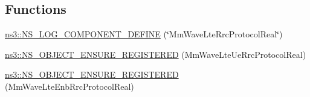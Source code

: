 \subsection*{Functions}
\begin{DoxyCompactItemize}
\item 
\hyperlink{namespacens3_abfce059cb3db299a2934a21e26139ab5}{ns3\+::\+N\+S\+\_\+\+L\+O\+G\+\_\+\+C\+O\+M\+P\+O\+N\+E\+N\+T\+\_\+\+D\+E\+F\+I\+NE} (\char`\"{}Mm\+Wave\+Lte\+Rrc\+Protocol\+Real\char`\"{})
\item 
\hyperlink{namespacens3_ac20e2ee5ce643def8174312956e2715c}{ns3\+::\+N\+S\+\_\+\+O\+B\+J\+E\+C\+T\+\_\+\+E\+N\+S\+U\+R\+E\+\_\+\+R\+E\+G\+I\+S\+T\+E\+R\+ED} (Mm\+Wave\+Lte\+Ue\+Rrc\+Protocol\+Real)
\item 
\hyperlink{namespacens3_a8d06b46fed33a8ff4350e7eb6288734c}{ns3\+::\+N\+S\+\_\+\+O\+B\+J\+E\+C\+T\+\_\+\+E\+N\+S\+U\+R\+E\+\_\+\+R\+E\+G\+I\+S\+T\+E\+R\+ED} (Mm\+Wave\+Lte\+Enb\+Rrc\+Protocol\+Real)
\end{DoxyCompactItemize}
